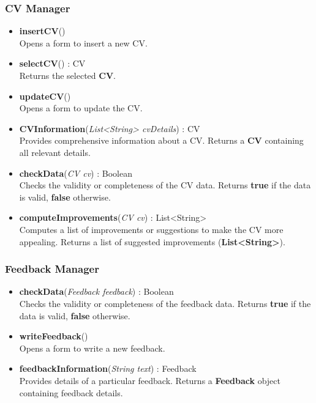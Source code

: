\subsubsection*{CV Manager}
\begin{itemize}

    \item \textbf{insertCV}() \\
    Opens a form to insert a new CV.

    \item \textbf{selectCV}() : CV \\  
    Returns the selected \textbf{CV}.

    \item \textbf{updateCV}() \\
    Opens a form to update the CV.

    \item \textbf{CVInformation}(\textit{List<String> cvDetails}) : CV \\
    Provides comprehensive information about a CV.  
    Returns a \textbf{CV} containing all relevant details.

    \item \textbf{checkData}(\textit{CV cv}) : Boolean \\
    Checks the validity or completeness of the CV data.  
    Returns \textbf{true} if the data is valid, \textbf{false} otherwise.

    \item \textbf{computeImprovements}(\textit{CV cv}) : List<String> \\
    Computes a list of improvements or suggestions to make the CV more appealing.  
    Returns a list of suggested improvements (\textbf{List<String>}).

\end{itemize}

\subsubsection*{Feedback Manager}
\begin{itemize}

    \item \textbf{checkData}(\textit{Feedback feedback}) : Boolean \\
    Checks the validity or completeness of the feedback data.  
    Returns \textbf{true} if the data is valid, \textbf{false} otherwise.

    \item \textbf{writeFeedback}() \\
    Opens a form to write a new feedback.

    \item \textbf{feedbackInformation}(\textit{String text}) : Feedback \\
    Provides details of a particular feedback.  
    Returns a \textbf{Feedback} object containing feedback details.

\end{itemize}

